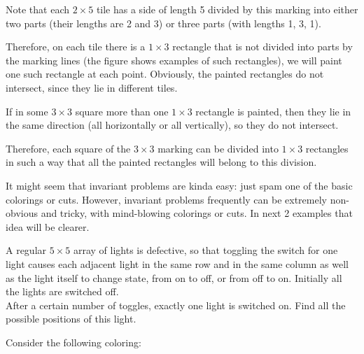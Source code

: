 Note that each $2\times 5$ tile has a side of length 5 divided by this marking into either two parts (their lengths are 2 and 3) or three parts (with lengths 1, 3, 1).

Therefore, on each tile there is a $1\times 3$ rectangle that is not divided into parts by the marking lines (the figure shows examples of such rectangles), we will paint one such rectangle at each point. Obviously, the painted rectangles do not intersect, since they lie in different tiles.

If in some $3\times 3$ square more than one $1\times 3$ rectangle is painted, then they lie in the same direction (all horizontally or all vertically), so they do not intersect.

Therefore, each square of the $3\times 3$ marking can be divided into $1\times 3$ rectangles in such a way that all the painted rectangles will belong to this division.

It might seem that invariant problems are kinda easy: just spam one of the basic colorings or cuts. However, invariant problems frequently can be extremely non-obvious and tricky, with mind-blowing colorings or cuts. In next 2 examples that idea will be clearer. 

\begin{example} [APMO 2007]
    A regular $5\times 5$ array of lights is defective, so that toggling the switch for one light causes each adjacent light in the same row and in the same column as well as the light itself to change state, from on to off, or from off to on. Initially all the lights are switched off.\\ After a certain number of toggles, exactly one light is switched on. Find all the possible positions of this light.
\end{example}

Consider the following coloring:

\begin{center} 
\end{center}

